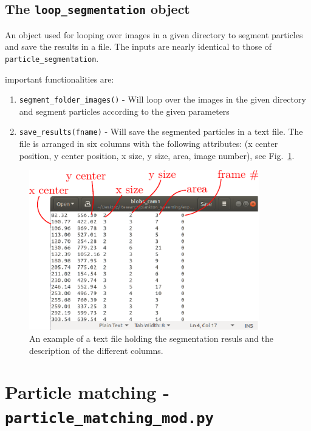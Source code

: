 \documentclass[10pt,a4paper]{article}
\begin{document}
\subsection{The \texttt{loop\_segmentation} object} 


An object used for looping over images in a given directory to segment particles and save the results in a file. The inputs are nearly identical to those of \texttt{particle\_segmentation}.


important functionalities are:
%
\begin{enumerate}
	\item \texttt{segment\_folder\_images()} - Will loop over the images in the given directory and segment particles according to the given parameters
	\item \texttt{save\_results(fname)} - Will save the segmented particles in a text file. The file is arranged in six columns with the following attributes: (x center position, y center position, x size, y size, area, image number), see Fig.~\ref{fig:blobfile}.
\end{enumerate}

\begin{figure}[!ht]
	\centering
	\includegraphics[width=10cm]{blob_file.pdf}
	\caption{An example of a text file holding the segmentation resuls and the description of the different columns. \label{fig:blobfile}} 
\end{figure}








\section{Particle matching - \texttt{particle\_matching\_mod.py}} \label{sec:matching}
\end{document}
